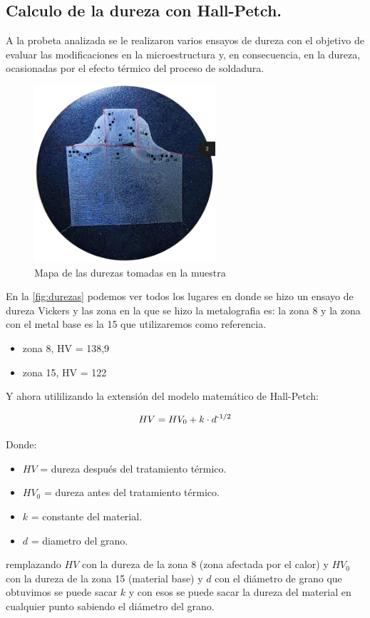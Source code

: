 \documentclass[12pt,a4paper]{article}
\begin{document}
\subsection{Calculo de la dureza con Hall-Petch.}

A la probeta analizada se le realizaron varios ensayos de dureza con el objetivo de evaluar las modificaciones en la microestructura y, en consecuencia, en la dureza, ocasionadas por el efecto térmico del proceso de soldadura.

\begin{figure}[h] 
    \centering
    \includegraphics[width=0.6\textwidth]{Figuras/mapa_de_durezas.png} 
    \caption{Mapa de las durezas tomadas en la muestra}
    \label{fig:durezas}
\end{figure}

En la \autoref{fig:durezas} podemos ver todos los lugares en donde se hizo un ensayo de dureza Vickers y las zona en la que se hizo la metalografia es: la zona 8 y la zona con el metal base es la 15 que utilizaremos como referencia.

\begin{itemize}
    \item zona 8, HV = 138,9
    \item zona 15, HV = 122
\end{itemize}

Y ahora utililizando la extensión del modelo matemático de Hall-Petch:

\begin{equation}
    HV = HV_0 + k\cdot d \textsuperscript{-1/2}
    \label{eq:HV}
\end{equation}

Donde:

\begin{itemize}
    \item $\textit{HV}$ = dureza después del tratamiento térmico.
    \item $\textit{HV}_0$ = dureza antes del tratamiento térmico.
    \item $k$ = constante del material.
    \item $d$ = diametro del grano.
\end{itemize}
remplazando $\textit{HV}$ con la dureza de la zona 8 (zona afectada por el calor) y $\textit{HV}_0$ con la dureza de la zona 15 (material base) y $d$ con el diámetro de grano que obtuvimos se puede sacar $k$ y con esos se puede sacar la dureza del material en cualquier punto sabiendo el diámetro del grano.
\end{document}
